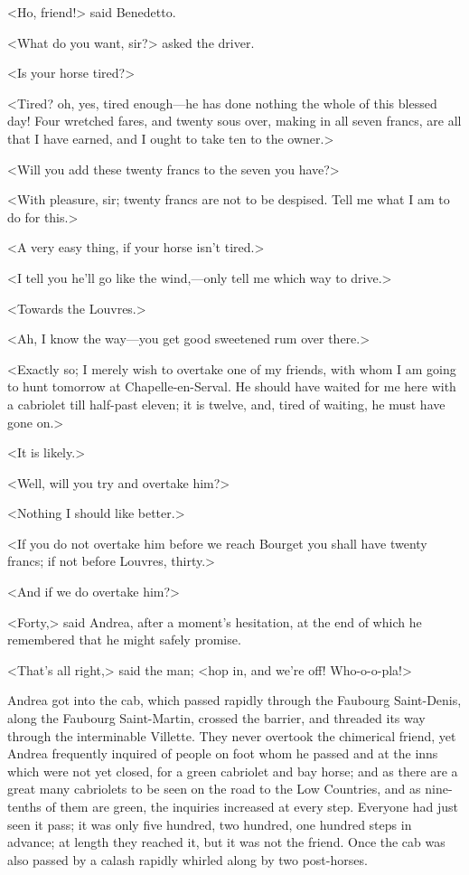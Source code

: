 <Ho, friend!> said Benedetto. 

 <What do you want, sir?> asked the driver. 

 <Is your horse tired?> 

 <Tired? oh, yes, tired enough—he has done nothing the whole of this blessed day! Four wretched fares, and twenty sous over, making in all seven francs, are all that I have earned, and I ought to take ten to the owner.> 

 <Will you add these twenty francs to the seven you have?> 

 <With pleasure, sir; twenty francs are not to be despised. Tell me what I am to do for this.> 

 <A very easy thing, if your horse isn't tired.> 

 <I tell you he'll go like the wind,—only tell me which way to drive.> 

 <Towards the Louvres.> 

 <Ah, I know the way—you get good sweetened rum over there.> 

 <Exactly so; I merely wish to overtake one of my friends, with whom I am going to hunt tomorrow at Chapelle-en-Serval. He should have waited for me here with a cabriolet till half-past eleven; it is twelve, and, tired of waiting, he must have gone on.> 

 <It is likely.> 

 <Well, will you try and overtake him?> 

 <Nothing I should like better.> 

 <If you do not overtake him before we reach Bourget you shall have twenty francs; if not before Louvres, thirty.> 

 <And if we do overtake him?> 

 <Forty,> said Andrea, after a moment's hesitation, at the end of which he remembered that he might safely promise. 

 <That's all right,> said the man; <hop in, and we're off! Who-o-o-pla!> 

 Andrea got into the cab, which passed rapidly through the Faubourg Saint-Denis, along the Faubourg Saint-Martin, crossed the barrier, and threaded its way through the interminable Villette. They never overtook the chimerical friend, yet Andrea frequently inquired of people on foot whom he passed and at the inns which were not yet closed, for a green cabriolet and bay horse; and as there are a great many cabriolets to be seen on the road to the Low Countries, and as nine-tenths of them are green, the inquiries increased at every step. Everyone had just seen it pass; it was only five hundred, two hundred, one hundred steps in advance; at length they reached it, but it was not the friend. Once the cab was also passed by a calash rapidly whirled along by two post-horses. 

